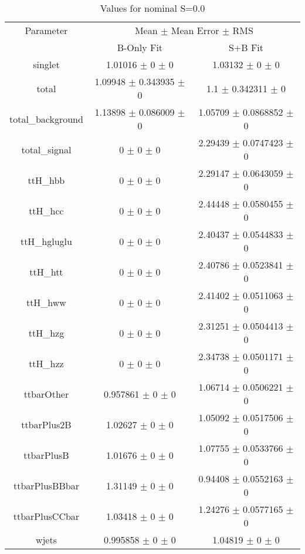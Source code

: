 \begin{table}
\centering
\caption{Values for nominal S=0.0}
\begin{tabular}{ccc}
\toprule
Parameter & \multicolumn{2}{c}{Mean $\pm$ Mean Error $\pm$ RMS}\\
 & B-Only Fit & S+B Fit\\
\midrule
singlet & \num{1.01016} $\pm$ \num{0} $\pm$ \num{0} & \num{1.03132} $\pm$ \num{0} $\pm$ \num{0}\\
total & \num{1.09948} $\pm$ \num{0.343935} $\pm$ \num{0} & \num{1.1} $\pm$ \num{0.342311} $\pm$ \num{0}\\
total\_background & \num{1.13898} $\pm$ \num{0.086009} $\pm$ \num{0} & \num{1.05709} $\pm$ \num{0.0868852} $\pm$ \num{0}\\
total\_signal & \num{0} $\pm$ \num{0} $\pm$ \num{0} & \num{2.29439} $\pm$ \num{0.0747423} $\pm$ \num{0}\\
ttH\_hbb & \num{0} $\pm$ \num{0} $\pm$ \num{0} & \num{2.29147} $\pm$ \num{0.0643059} $\pm$ \num{0}\\
ttH\_hcc & \num{0} $\pm$ \num{0} $\pm$ \num{0} & \num{2.44448} $\pm$ \num{0.0580455} $\pm$ \num{0}\\
ttH\_hgluglu & \num{0} $\pm$ \num{0} $\pm$ \num{0} & \num{2.40437} $\pm$ \num{0.0544833} $\pm$ \num{0}\\
ttH\_htt & \num{0} $\pm$ \num{0} $\pm$ \num{0} & \num{2.40786} $\pm$ \num{0.0523841} $\pm$ \num{0}\\
ttH\_hww & \num{0} $\pm$ \num{0} $\pm$ \num{0} & \num{2.41402} $\pm$ \num{0.0511063} $\pm$ \num{0}\\
ttH\_hzg & \num{0} $\pm$ \num{0} $\pm$ \num{0} & \num{2.31251} $\pm$ \num{0.0504413} $\pm$ \num{0}\\
ttH\_hzz & \num{0} $\pm$ \num{0} $\pm$ \num{0} & \num{2.34738} $\pm$ \num{0.0501171} $\pm$ \num{0}\\
ttbarOther & \num{0.957861} $\pm$ \num{0} $\pm$ \num{0} & \num{1.06714} $\pm$ \num{0.0506221} $\pm$ \num{0}\\
ttbarPlus2B & \num{1.02627} $\pm$ \num{0} $\pm$ \num{0} & \num{1.05092} $\pm$ \num{0.0517506} $\pm$ \num{0}\\
ttbarPlusB & \num{1.01676} $\pm$ \num{0} $\pm$ \num{0} & \num{1.07755} $\pm$ \num{0.0533766} $\pm$ \num{0}\\
ttbarPlusBBbar & \num{1.31149} $\pm$ \num{0} $\pm$ \num{0} & \num{0.94408} $\pm$ \num{0.0552163} $\pm$ \num{0}\\
ttbarPlusCCbar & \num{1.03418} $\pm$ \num{0} $\pm$ \num{0} & \num{1.24276} $\pm$ \num{0.0577165} $\pm$ \num{0}\\
wjets & \num{0.995858} $\pm$ \num{0} $\pm$ \num{0} & \num{1.04819} $\pm$ \num{0} $\pm$ \num{0}\\
\bottomrule
\end{tabular}
\end{table}